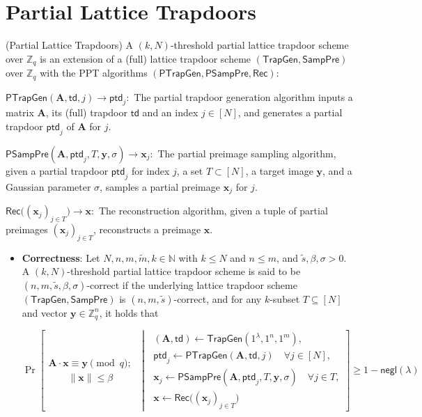 \section{Partial Lattice Trapdoors}
\begin{definition} (Partial Lattice Trapdoors) A $(k,N)$-threshold partial lattice trapdoor scheme over $\mathbb{Z}_q$
is an extension of a (full) lattice trapdoor scheme
$(\mathsf{TrapGen}, \mathsf{SampPre})$ over $\mathbb{Z}_q$ with the PPT algorithms
$(\mathsf{PTrapGen}, \mathsf{PSampPre}, \mathsf{Rec})$:

$
 \mathsf{PTrapGen}(\mathbf{A}, \mathsf{td}, j) \rightarrow \mathsf{ptd}_j:
$
The partial trapdoor generation algorithm inputs a matrix $\mathbf{A}$,
its (full) trapdoor $\mathsf{td}$ and an index $j \in [N]$, and generates
a partial trapdoor $\mathsf{ptd}_j$ of $\mathbf{A}$ for $j$.

$
 \mathsf{PSampPre}(\mathbf{A}, \mathsf{ptd}_j, T, \mathbf{y}, \sigma) \rightarrow \mathbf x_j:
$
The partial preimage sampling algorithm, given a partial trapdoor
$\mathsf{ptd}_j$ for index $j$, a set $T \subset [N]$, a target image $\mathbf{y}$,
and a Gaussian parameter $\sigma$, samples a partial preimage $\mathbf x_j$ for $j$.

$
\mathsf{Rec}\bigl((\mathbf x_j)_{j \in T}\bigr) \rightarrow \mathbf x:
$
The reconstruction algorithm, given a tuple of partial preimages
$(\mathbf x_j)_{j \in T}$, reconstructs a preimage $\mathbf x$.

\vspace{1em}

\begin{itemize}
    \item  \textbf{Correctness}:
Let $N,n,m,\widetilde{m},k \in \mathbb{N}$ with $k \leq N$ and $n \leq m$,
and $\widetilde{s}, \beta, \sigma > 0$.
A $(k,N)$-threshold partial lattice trapdoor scheme is said to be
$(n,m,\widetilde{s},\beta,\sigma)$-correct if the underlying lattice trapdoor
scheme $(\mathsf{TrapGen}, \mathsf{SampPre})$ is $(n,m,\widetilde{s})$-correct,
and for any $k$-subset $T \subseteq [N]$ and vector $\mathbf y \in \mathbb{Z}_q^n$, it holds that

\[
\Pr\!\left[
\begin{array}{l}
    \mathbf{A}\cdot \mathbf{x} \equiv \mathbf{y} \pmod q;\\
    \qquad \|\mathbf{x} \| \le \beta
\end{array}
\;\middle|\;
\begin{array}{l}
    (\mathbf{A},\mathsf{td})
        \leftarrow
        \mathsf{TrapGen}(1^\lambda,1^n,1^m), \\[0.3em]
    \mathsf{ptd}_j
        \leftarrow
        \mathsf{PTrapGen}(\mathbf{A},\mathsf{td},j)
        \quad \forall j \in [N], \\[0.3em]
    \mathbf{x} _j
        \leftarrow
        \mathsf{PSampPre}(\mathbf{A},\mathsf{ptd}_j,T,\mathbf{y} ,\sigma)
        \quad \forall j \in T, \\[0.3em]
    \mathbf{x} 
        \leftarrow
        \mathsf{Rec}\bigl((\mathbf{x} _j)_{j\in T}\bigr)
\end{array}
\right]
\ge
1-\mathsf{negl}(\lambda)
\]


\end{itemize}
\end{definition}
